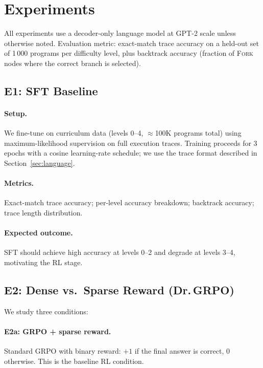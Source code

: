 \section{Experiments}
\label{sec:experiments}

All experiments use a decoder-only language model at GPT-2 scale unless
otherwise noted.
Evaluation metric: exact-match trace accuracy on a held-out set of 1\,000
programs per difficulty level, plus backtrack accuracy (fraction of
\textsc{Fork} nodes where the correct branch is selected).

\subsection{E1: SFT Baseline}
\label{sec:e1}

\paragraph{Setup.}
We fine-tune on \gore{} curriculum data (levels 0--4, ${\approx}$100K programs
total) using maximum-likelihood supervision on full execution traces.
Training proceeds for 3 epochs with a cosine learning-rate schedule; we use the
trace format described in Section~\ref{sec:language}.

\paragraph{Metrics.}
Exact-match trace accuracy; per-level accuracy breakdown;
backtrack accuracy; trace length distribution.

\paragraph{Expected outcome.}
SFT should achieve high accuracy at levels 0--2 and degrade at levels 3--4,
motivating the RL stage.


\subsection{E2: Dense vs.\ Sparse Reward (Dr.\,GRPO)}
\label{sec:e2}

We study three conditions:

\paragraph{E2a: GRPO + sparse reward.}
Standard GRPO \citep{shao2024deepseekmath} with binary reward: $+1$ if the
final answer is correct, $0$ otherwise.
This is the baseline RL condition.

